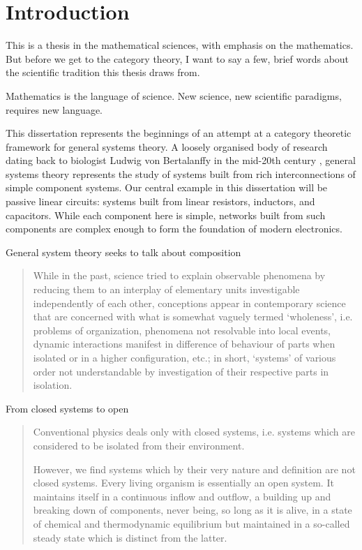 {}
\chapter*{Introduction}

This is a thesis in the mathematical sciences, with emphasis on the mathematics.
But before we get to the category theory, I want to say a few, brief words about
the scientific tradition this thesis draws from.

Mathematics is the language of science. New science, new scientific paradigms,
requires new language.

This dissertation represents the beginnings of an attempt at a category
theoretic framework for general systems theory. A loosely organised body of
research dating back to biologist Ludwig von Bertalanffy in the mid-20th
century \cite{Ber}, general systems theory represents the study of systems built
from rich interconnections of simple component systems. Our central example in
this dissertation will be passive linear circuits: systems built from linear
resistors, inductors, and capacitors.  While each component here is simple,
networks built from such components are complex enough to form the foundation of
modern electronics.

General system theory seeks to talk about composition
\begin{quotation}
  While in the past, science tried to explain observable phenomena by reducing
  them to an interplay of elementary units investigable independently of each
  other, conceptions appear in contemporary science that are concerned with what
  is somewhat vaguely termed `wholeness', i.e. problems of organization,
  phenomena not resolvable into local events, dynamic interactions manifest in
  difference of behaviour of parts when isolated or in a higher configuration,
  etc.; in short, `systems' of various order not understandable by investigation
  of their respective parts in isolation. 
\end{quotation}


From closed systems to open
\begin{quotation}
  Conventional physics deals only with closed systems, i.e. systems which are
  considered to be isolated from their environment.

  However, we find systems which by their very nature and definition are not
  closed systems. Every living organism is essentially an open system. It
  maintains itself in a continuous inflow and outflow, a building up and
  breaking down of components, never being, so long as it is alive, in a state
  of chemical and thermodynamic equilibrium but maintained in a so-called steady
  state which is distinct from the latter.  
\end{quotation}

